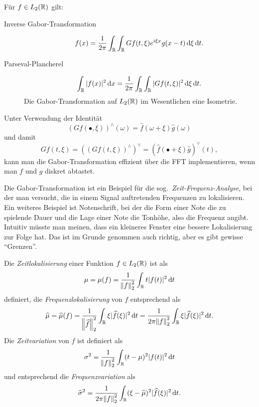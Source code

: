 \begin{proposition}
Für $ f \in L_{2}(\mathbb{R}) $ gilt:
\begin{description}
\item [Inverse Gabor-Transformation]
  \[
    f(x) = \frac{1}{2\pi} \int_{\R} \int_{\R} Gf(t,\xi) e^{i \xi x} g(x - t) \dif \xi \dif t.
  \]
\item [Parseval-Plancherel]
  \[
    \int_{\R} |f(x)|^{2} \dif x = \frac{1}{2\pi} \int_{\R}\int_{\R} |Gf(t,\xi)|^{2} \dif \xi \dif t.
  \]
  Die Gabor-Transformation auf $ L_{2}(\mathbb{R}) $ im Wesentlichen eine Isometrie.
\end{description}
\end{proposition}

\begin{remark}
Unter Verwendung der Identität
\[
    (Gf(\bullet, \xi))^{\wedge}(\omega)
  = \widehat{f}(\omega + \xi)\widehat{g}(\omega)
\]
und damit
\[
    Gf(t, \xi)
  = \left( (Gf(t, \xi))^{\wedge} \right)^{\vee}
  = \left( \widehat{f}(\bullet + \xi) \widehat{g} \right)^{\vee}(t),
\]
kann man die Gabor-Transformation effizient über die FFT implementieren, wenn man $ f $ und $ g $
diskret abtastet.
\end{remark}

Die Gabor-Transformation ist ein Beispiel für die sog.\ \emph{Zeit-Frequenz-Analyse}, bei der man
versucht, die in einem Signal auftretenden Frequenzen zu lokalisieren. Ein weiteres Beispiel ist
Notenschrift, bei der die Form einer Note die zu spielende Dauer und die Lage einer Note die
Tonhöhe, also die Frequenz angibt. Intuitiv müsste man meinen, dass ein kleineres Fenster eine 
bessere Lokalisierung zur Folge hat. Das ist im Grunde genommen auch richtig, aber es gibt gewisse 
\enquote{Grenzen}.

\begin{definition}
Die \emph{Zeitlokalisierung} einer Funktion $ f \in L_{2}(\mathbb{R}) $ ist als
\[
  \mu = \mu(f) = \frac{1}{\norm{f}_{2}^{2}} \int_{\R} t |f(t)|^{2} \dif t
\]
definiert, die \emph{Frequenzlokalisierung} von $ f $ entsprechend als
\[
    \widehat{\mu} = \widehat{\mu}(f)
  = \frac{1}{\norm{\widehat{f}}_{2}^{2}} \int_{\R} \xi |\widehat{f}(\xi)|^{2} \dif t
  = \frac{1}{2\pi \norm{f}_{2}^{2}} \int_{\R} \xi |\widehat{f}(\xi)|^{2} \dif t.
\]
Die \emph{Zeitvariation} von $ f $ ist definiert als
\[
  \sigma^{2} = \frac{1}{\norm{f}_{2}^{2}} \int_{\R} (t - \mu)^{2} |f(t)|^{2} \dif t
\]
und entsprechend die \emph{Frequenzvariation} als
\[
    \widehat{\sigma}^{2}
  = \frac{1}{2\pi \norm{f}_{2}^{2}} 
      \int_{\R} (\xi - \widehat{\mu})^{2} |\widehat{f}(\xi)|^{2} \dif t.
\]
\end{definition}

